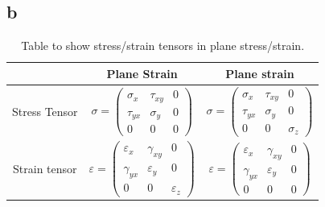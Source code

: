 \subsection{b}
\begin{table}[H]
    \begin{center}
        \begin{tabular}{ c c c }
            \toprule
                          & Plane Strain                              & Plane strain                              \\
            \midrule
            Stress Tensor & $\sigma = \begin{pmatrix}
                    \sigma_x  & \tau_{xy} & 0 \\
                    \tau_{yx} & \sigma_y  & 0 \\
                    0         & 0         & 0
                \end{pmatrix}$      & $\sigma = \begin{pmatrix}
                    \sigma_x  & \tau_{xy} & 0        \\
                    \tau_{yx} & \sigma_y  & 0        \\
                    0         & 0         & \sigma_z
                \end{pmatrix}$      \\
            Strain tensor & $\varepsilon = \begin{pmatrix}
                    \varepsilon_x & \gamma_{xy}   & 0             \\
                    \gamma_{yx}   & \varepsilon_y & 0             \\
                    0             & 0             & \varepsilon_z
                \end{pmatrix}$ & $\varepsilon = \begin{pmatrix}
                    \varepsilon_x & \gamma_{xy}   & 0 \\
                    \gamma_{yx}   & \varepsilon_y & 0 \\
                    0             & 0             & 0
                \end{pmatrix}$ \\
            \bottomrule
        \end{tabular}
        \caption{Table to show stress/strain tensors in plane stress/strain.}
    \end{center}
\end{table}
